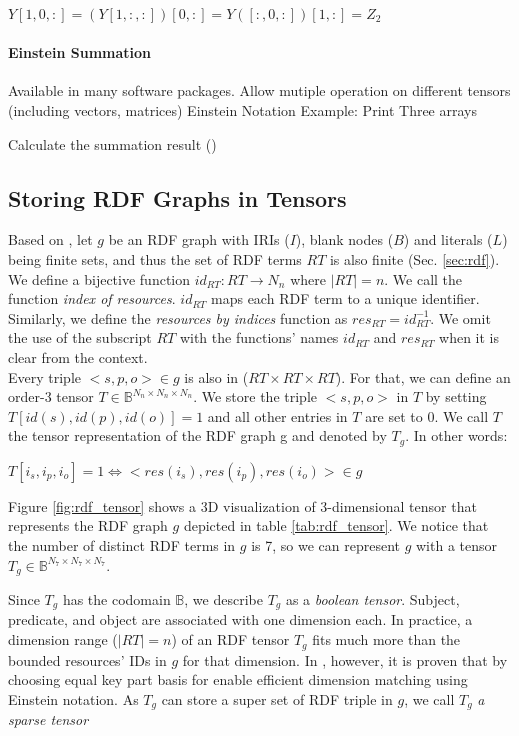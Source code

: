 \centerline{$Y[1, 0, :] = (Y[1, :, :])[0, :] = Y([:, 0, :])[1, :] = Z_2$}

\paragraph{Einstein Summation}
\label{einstein_summation}
Available in many software packages.
Allow mutiple operation on different tensors (including vectors, matrices)
Einstein Notation Example:
Print Three arrays

Calculate the summation result ()

\subsection{Storing RDF Graphs in Tensors}
\label{sec:rdf_tensor}
Based on \cite{tentris2020}, let $g$ be an RDF graph with IRIs ($I$), blank nodes ($B$) and literals ($L$) being finite sets, and thus the set of RDF terms $RT$ is also finite (Sec. \ref{sec:rdf}). We define a bijective function $id_{RT}: RT \to N_n$ where $|RT|=n$. We call the function \textit{index of resources}. $id_{RT}$ maps each RDF term to a unique identifier. Similarly, we define the \textit{resources by indices} function as $res_{RT} = id_{RT}^{-1}$. 
We omit the use of the subscript $RT$ with the functions' names $id_{RT}$ and $res_{RT}$ when it is clear from the context. \\

Every triple $<s, p, o> \in g$ is also in ($RT \times RT \times RT$). For that, we can define an order-3 tensor $T \in \mathbb{B}^{N_n \times N_n \times N_n}$. We store the triple $<s, p, o>$ in $T$ by setting $T[id(s), id(p), id(o)] = 1$ and all other entries in $T$ are set to 0. We call $T$ the tensor representation of the RDF graph g and denoted by $T_g$. In other words: \\
\centerline{$T[i_s, i_p, i_o] = 1 \iff <res(i_s), res(i_p), res(i_o)> \in g$}

\begin{example}
\label{ex:rdf_tensor}
Figure \ref{fig:rdf_tensor} shows a 3D visualization of 3-dimensional tensor that represents the RDF graph $g$ depicted in table \ref{tab:rdf_tensor}. We notice that the number of distinct RDF terms in $g$ is 7, so we can represent $g$ with a tensor $T_g \in \mathbb{B}^{N_7 \times N_7 \times N_7}$. 
\end{example}

Since $T_g$ has the codomain $\mathbb{B}$, we describe $T_g$ as a \textit{boolean tensor}. Subject, predicate, and object are associated with one dimension each. In practice, a dimension range  ($|RT| =n$) of an RDF tensor $T_g$ fits much more than the bounded resources' IDs in $g$ for that dimension. In \cite{tentris2020}, however, it is proven that by choosing equal key part basis for enable efficient dimension matching using Einstein notation. As $T_g$ can store a super set of RDF triple in $g$, we call $T_g$ \textit{a sparse tensor}

